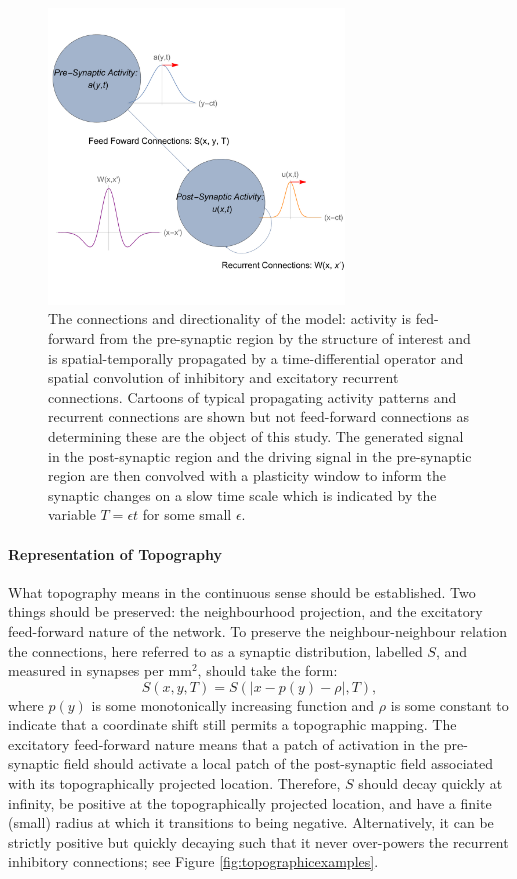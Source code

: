 \begin{figure}[h!]
	\centering
	\includegraphics[width=0.7\textwidth]{images/nft_activity/model_summary}
	\def\c{The connections and directionality of the model: activity is fed-forward from the pre-synaptic region by the structure of interest and is spatial-temporally propagated by a time-differential operator and spatial convolution of inhibitory and excitatory recurrent connections. }
	\caption[\c]{\c Cartoons of typical propagating activity patterns and recurrent connections are shown but not feed-forward connections as determining these are the object of this study. The generated signal in the post-synaptic region and the driving signal in the pre-synaptic region are then convolved with a plasticity window to inform the synaptic changes on a slow time scale which is indicated by the variable $T = \epsilon t$ for some small $\epsilon$. \label{model-summary}}
\end{figure}
\paragraph{Representation of Topography}
What topography means in the continuous sense should be established. Two things should be preserved: the neighbourhood projection, and the excitatory feed-forward nature of the network. To preserve the neighbour-neighbour relation the connections, here referred to as a synaptic distribution, labelled $S$, and measured in synapses per mm$^2$,  should take the form:
\begin{equation}
	S(x,y,T) = S(|x-p(y)- \rho|, T),
\end{equation}
where $p(y)$ is some monotonically increasing function and $\rho$ is some constant to indicate that a coordinate shift still permits a topographic mapping. The excitatory feed-forward nature means that a patch of activation in the pre-synaptic field should activate a local patch of the post-synaptic field associated with its topographically projected location. Therefore, $S$ should decay quickly at infinity, be positive at the topographically projected location, and have a finite (small) radius at which it transitions to being negative. Alternatively, it can be strictly positive but quickly decaying such that it never over-powers the recurrent inhibitory connections; see Figure \ref{fig:topographicexamples}.

